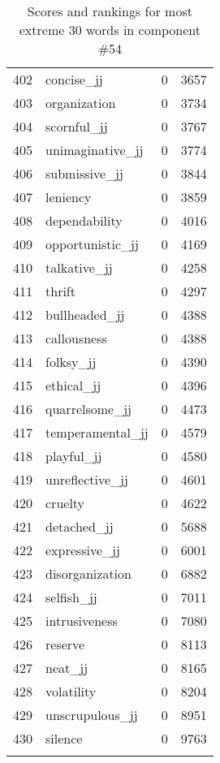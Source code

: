 \begin{longtable}[!htbp]{| rlr@{.}l |}
    402 & concise\_jj & 0 & 3657 \\
    403 & organization & 0 & 3734 \\
    404 & scornful\_jj & 0 & 3767 \\
    405 & unimaginative\_jj & 0 & 3774 \\
    406 & submissive\_jj & 0 & 3844 \\
    407 & leniency & 0 & 3859 \\
    408 & dependability & 0 & 4016 \\
    409 & opportunistic\_jj & 0 & 4169 \\
    410 & talkative\_jj & 0 & 4258 \\
    411 & thrift & 0 & 4297 \\
    412 & bullheaded\_jj & 0 & 4388 \\
    413 & callousness & 0 & 4388 \\
    414 & folksy\_jj & 0 & 4390 \\
    415 & ethical\_jj & 0 & 4396 \\
    416 & quarrelsome\_jj & 0 & 4473 \\
    417 & temperamental\_jj & 0 & 4579 \\
    418 & playful\_jj & 0 & 4580 \\
    419 & unreflective\_jj & 0 & 4601 \\
    420 & cruelty & 0 & 4622 \\
    421 & detached\_jj & 0 & 5688 \\
    422 & expressive\_jj & 0 & 6001 \\
    423 & disorganization & 0 & 6882 \\
    424 & selfish\_jj & 0 & 7011 \\
    425 & intrusiveness & 0 & 7080 \\
    426 & reserve & 0 & 8113 \\
    427 & neat\_jj & 0 & 8165 \\
    428 & volatility & 0 & 8204 \\
    429 & unscrupulous\_jj & 0 & 8951 \\
    430 & silence & 0 & 9763 \\
    \hline
    \caption{Scores and rankings for most extreme 30 words in component \#54} \\
\end{longtable}
